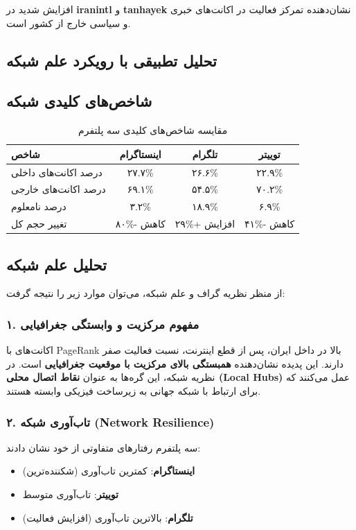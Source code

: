 \documentclass{article}
\begin{document}
		افزایش شدید در \textbf{iranintl} و \textbf{tanhayek} نشان‌دهنده تمرکز فعالیت در اکانت‌های خبری و سیاسی خارج از کشور است.
		
		\subsection{تحلیل تطبیقی با رویکرد علم شبکه}
		
		\subsection*{شاخص‌های کلیدی شبکه}
		
		\begin{table}[!htbp]
			\centering
			\caption{مقایسه شاخص‌های کلیدی سه پلتفرم}
			\label{tab:comparison2}
			\begin{tabular}{|l|c|c|c|}
				\hline
				\textbf{شاخص} & \textbf{اینستاگرام} & \textbf{تلگرام} & \textbf{توییتر} \\ \hline
				درصد اکانت‌های داخلی & ۲۷.۷\% & ۲۶.۶\% & ۲۲.۹\% \\ \hline
				درصد اکانت‌های خارجی & ۶۹.۱\% & ۵۴.۵\% & ۷۰.۲\% \\ \hline
				درصد نامعلوم & ۳.۲\% & ۱۸.۹\% & ۶.۹\% \\ \hline
				تغییر حجم کل & ۸۰\%- کاهش & ۲۹\%+ افزایش & ۴۱\%- کاهش \\ \hline
			\end{tabular}
		\end{table}
		
		\subsection*{تحلیل علم شبکه}
		
		از منظر نظریه گراف و علم شبکه، می‌توان موارد زیر را نتیجه گرفت:
		
		\subsubsection*{۱. مفهوم مرکزیت و وابستگی جغرافیایی}
		اکانت‌های با PageRank بالا در داخل ایران، پس از قطع اینترنت، نسبت فعالیت صفر دارند. این پدیده نشان‌دهنده \textbf{همبستگی بالای مرکزیت با موقعیت جغرافیایی} است. در نظریه شبکه، این گره‌ها به عنوان \textbf{نقاط اتصال محلی (Local Hubs)} عمل می‌کنند که برای ارتباط با شبکه جهانی به زیرساخت فیزیکی وابسته هستند.
		
		\subsubsection*{۲. تاب‌آوری شبکه (Network Resilience)}
		سه پلتفرم رفتارهای متفاوتی از خود نشان دادند:
		\begin{itemize}
			\item \textbf{اینستاگرام}: کمترین تاب‌آوری (شکننده‌ترین)
			\item \textbf{توییتر}: تاب‌آوری متوسط
			\item \textbf{تلگرام}: بالاترین تاب‌آوری (افزایش فعالیت)
		\end{itemize}
		
\end{document}
